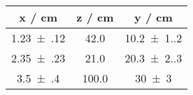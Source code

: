 \documentclass{scrartcl}
\begin{document}
\begin{tabular}{ccc}\toprule
x / cm & z / cm & y / cm\\ 
\midrule
\num{1.23(12)} & 42.0 & \num{10.2(1.2)}\\
\num{2.35(23)} & 21.0 & \num{20.3(2.3)}\\
\num{3.5(4)} & 100.0 & \num{30(3)}\\
\bottomrule
\end{tabular}
\end{document}
